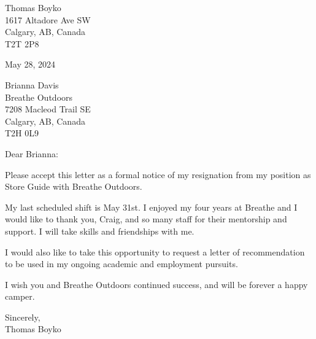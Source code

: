 \documentclass[11pt]{article}
\begin{document}
 
\medskip
Thomas Boyko\\
1617 Altadore Ave SW\\
Calgary, AB, Canada\\
T2T 2P8\\

\medskip

May 28, 2024\\

\medskip

Brianna Davis\\
Breathe Outdoors\\
7208 Macleod Trail SE \\
Calgary, AB, Canada\\
T2H 0L9\\

\bigskip

Dear Brianna:

\bigskip

Please accept this letter as a formal notice of my resignation from my position as Store Guide with Breathe Outdoors.

\bigskip

My last scheduled shift is May 31st. I enjoyed my four years at Breathe and I would like to thank you, Craig, and so many staff for their mentorship and support.  I will take skills and friendships with me. 

\bigskip

I would also like to take this opportunity to request a letter of recommendation to be used in my ongoing academic and employment pursuits. 

\bigskip 

I wish you and Breathe Outdoors continued success, and will be forever a happy camper.

\bigskip

Sincerely,\\
Thomas Boyko
\end{document}
